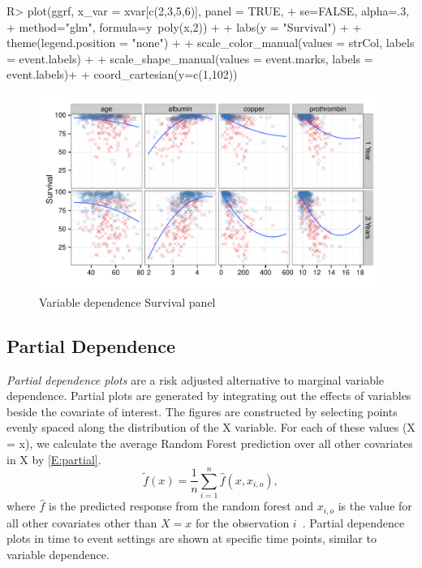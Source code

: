 \documentclass[nojss]{jss}\usepackage[]{graphicx}\usepackage[]{color}
\makeatletter
\def\maxwidth{ %
  \ifdim\Gin@nat@width>\linewidth
    \linewidth
  \else
    \Gin@nat@width
  \fi
}
\makeatother
\begin{document}
\begin{Schunk}
\begin{Sinput}
R> plot(ggrf, x_var = xvar[c(2,3,5,6)], panel = TRUE, 
+      se=FALSE, alpha=.3, 
+      method="glm", formula=y~poly(x,2)) + 
+  labs(y = "Survival") + 
+  theme(legend.position = "none") + 
+  scale_color_manual(values = strCol, labels = event.labels) + 
+  scale_shape_manual(values = event.marks, labels = event.labels)+
+   coord_cartesian(y=c(1,102))
\end{Sinput}
\begin{figure}[!htpb]

{\centering \includegraphics[width=\maxwidth]{figure/rfs-variable-plotCombines-1} 

}

\caption[Variable dependence Survival panel]{Variable dependence Survival panel\label{fig:variable-plotCombines}}
\end{figure}
\end{Schunk}

\subsection{Partial Dependence}\label{S:partialDependence}

\emph{Partial dependence plots} are a risk adjusted alternative to marginal variable dependence. Partial plots are generated by integrating out the effects of variables beside the covariate of interest. The figures are constructed by selecting points evenly spaced along the distribution of the X variable. For each of these values (X = x), we calculate the average Random Forest prediction over all other covariates in X by \eqref{E:partial}.
\begin{equation}
\tilde{f}(x) = \frac{1}{n} \sum_{i = 1}^n \hat{f}(x, x_{i, o}), 
\label{E:partial}
\end{equation}
where $\hat{f}$ is the predicted response from the random forest and $x_{i, o}$ is the value for all other covariates other than $X = x$ for the observation $i$~\citep{FriedmanGreedyfunction:2000}. Partial dependence plots in time to event settings are shown at specific time points, similar to variable dependence.
\end{document}
